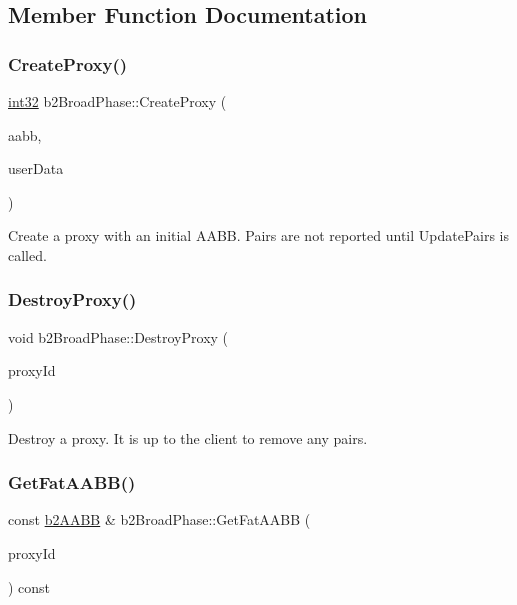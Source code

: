 \subsection{Member Function Documentation}
\mbox{\label{classb2_broad_phase_ae2f7af756bc55ece45221466c5af449c}} 
\subsubsection{\texorpdfstring{CreateProxy()}{CreateProxy()}}
{\footnotesize\ttfamily \mbox{\hyperlink{b2_settings_8h_a43d43196463bde49cb067f5c20ab8481}{int32}} b2\+Broad\+Phase\+::\+Create\+Proxy (\begin{DoxyParamCaption}\item[{const \mbox{\hyperlink{structb2_a_a_b_b}{b2\+A\+A\+BB}} \&}]{aabb,  }\item[{void $\ast$}]{user\+Data }\end{DoxyParamCaption})}

Create a proxy with an initial A\+A\+BB. Pairs are not reported until Update\+Pairs is called. \mbox{\label{classb2_broad_phase_a84f0fb227dc01a9b9baa55c7b8c68984}} 
\subsubsection{\texorpdfstring{DestroyProxy()}{DestroyProxy()}}
{\footnotesize\ttfamily void b2\+Broad\+Phase\+::\+Destroy\+Proxy (\begin{DoxyParamCaption}\item[{\mbox{\hyperlink{b2_settings_8h_a43d43196463bde49cb067f5c20ab8481}{int32}}}]{proxy\+Id }\end{DoxyParamCaption})}



Destroy a proxy. It is up to the client to remove any pairs. 

\mbox{\label{classb2_broad_phase_af5c47c036ca67d44676ea3cec73ae3d8}} 
\subsubsection{\texorpdfstring{GetFatAABB()}{GetFatAABB()}}
{\footnotesize\ttfamily const \mbox{\hyperlink{structb2_a_a_b_b}{b2\+A\+A\+BB}} \& b2\+Broad\+Phase\+::\+Get\+Fat\+A\+A\+BB (\begin{DoxyParamCaption}\item[{\mbox{\hyperlink{b2_settings_8h_a43d43196463bde49cb067f5c20ab8481}{int32}}}]{proxy\+Id }\end{DoxyParamCaption}) const\hspace{0.3cm}{\ttfamily [inline]}}




